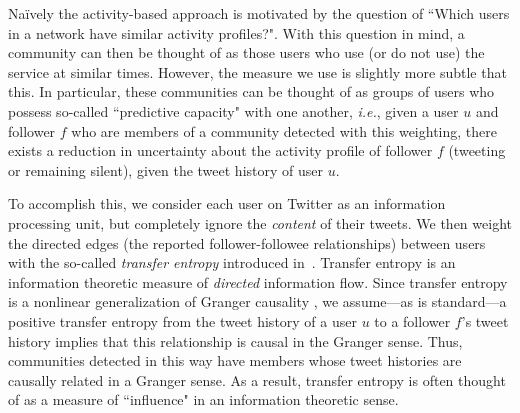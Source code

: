 Na\"ively the activity-based approach is motivated by the question of ``Which users in a network have similar activity profiles?".
 With this question in mind, a community can then be thought of as those users who use (or do not use) the service at similar times. However, the measure we use is slightly more subtle that this. In particular, these communities can be thought of as groups of users who possess so-called ``predictive capacity" with one another, \emph{i.e.}, given a user $u$ and follower $f$ who are members of a community detected with this weighting, there exists a reduction in uncertainty about the activity profile of follower $f$ (tweeting or remaining silent), given the tweet history of user $u$. 

To accomplish this, we consider each user on Twitter as an information processing unit, but completely ignore the \emph{content} of their tweets. We then weight the directed edges (the reported follower-followee relationships) between users with the so-called \emph{transfer entropy} introduced in~\cite{schreiber2000measuring}.  Transfer entropy is an information theoretic measure of \emph{directed} information flow. Since transfer entropy is a nonlinear generalization of Granger causality \cite{granger1963economic}, we assume---as is standard---a positive transfer entropy from the tweet history of a user $u$ to a follower $f$'s tweet history implies that this relationship is causal in the Granger sense.  Thus, communities detected in this way have members whose tweet histories are causally related in a Granger sense. As a result, transfer entropy is often thought of as a measure of ``influence" in an information theoretic sense. 

